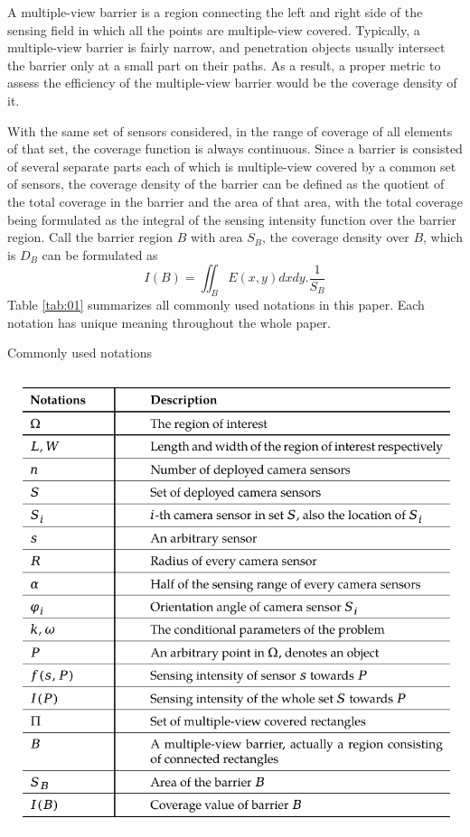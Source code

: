 A multiple-view barrier is a region connecting the left and right side of the sensing field in which all the points are multiple-view covered. Typically, a multiple-view barrier is fairly narrow, and penetration objects usually intersect the barrier only at a small part on their paths. As a result, a proper metric to assess the efficiency of the multiple-view barrier would be the coverage density of it.

With the same set of sensors considered, in the range of coverage of all elements of that set, the coverage function is always continuous. Since a barrier is consisted of several separate parts each of which is multiple-view covered by a common set of sensors, the coverage density of the barrier can be defined as the quotient of the total coverage in the barrier and the area of that area, with the total coverage being formulated as the integral of the sensing intensity function over the barrier region. Call the barrier region $B$ with area $S_B$, the coverage density over $B$, which is $D_B$ can be formulated as
\begin{equation}
\label{eq5}
I(B) = \iint_B{E(x, y)dxdy}.\frac{1}{S_B}
\end{equation}
Table \ref{tab:01} summarizes all commonly used notations in this paper. Each notation has unique meaning throughout the whole paper.
\captionsetup[table]{font=large}
\begin{table}[htb]
	\centering	
	\caption{Commonly used notations}
	\includegraphics[scale=1.]{Hinhanh/lookup-table}
	\label{tab:01}
\end{table}
